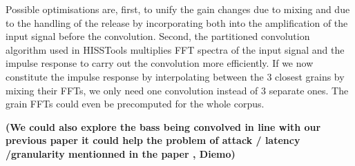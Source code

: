 Possible optimisations are, first, to unify the gain changes due to mixing and due to the handling of the release by incorporating both into the amplification of the input signal before the convolution.
Second, the partitioned convolution algorithm used in HISSTools multiplies FFT spectra of the input signal and the impulse response to carry out the convolution more efficiently.  If we now constitute the impulse response by interpolating between the 3 closest grains by mixing their FFTs, we only need one convolution instead of 3 separate ones.  The grain FFTs could even be precomputed for the whole corpus. %


\textbf{(We could also explore the bass being convolved in line with our previous paper it could help the problem of attack / latency /granularity mentionned in the paper \cite{TremblaySchwarz-nime2010-surfing-the-waves}, Diemo)}

